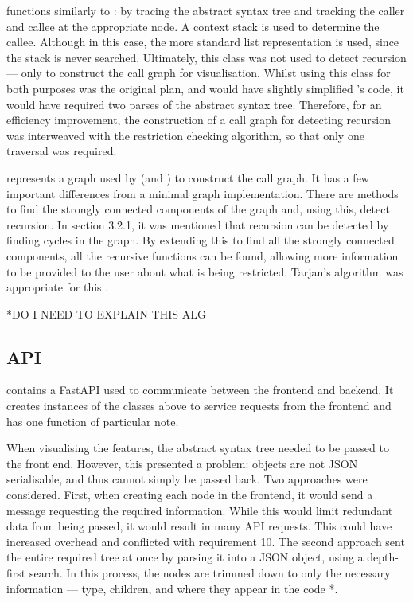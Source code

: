  functions similarly to : by tracing the abstract syntax tree and tracking the caller and callee at the appropriate node. A context stack is used to determine the callee. Although in this case, the more standard list representation is used, since the stack is never searched.
Ultimately, this class was not used to detect recursion --- only to construct the call graph for visualisation. Whilst using this class for both purposes was the original plan, and would have slightly simplified 's code, it would have required two parses of the abstract syntax tree. Therefore, for an efficiency improvement, the construction of a call graph for detecting recursion was interweaved with the restriction checking algorithm, so that only one traversal was required.

 represents a graph used by  (and ) to construct the call graph. It has a few important differences from a minimal graph implementation. There are methods to find the strongly connected components of the graph and, using this, detect recursion. In section 3.2.1, it was mentioned that recursion can be detected by finding cycles in the graph. By extending this to find all the strongly connected components, all the recursive functions can be found, allowing more information to be provided to the user about what is being restricted. Tarjan's algorithm was appropriate for this \cite{tarjan_depth-first_1972}. 

*DO I NEED TO EXPLAIN THIS ALG

\subsection{API}

 contains a FastAPI used to communicate between the frontend and backend. It creates instances of the classes above to service requests from the frontend and has one function of particular note.

When visualising the features, the abstract syntax tree needed to be passed to the front end. However, this presented a problem:  objects are not JSON serialisable, and thus cannot simply be passed back. Two approaches were considered. First, when creating each node in the frontend, it would send a message requesting the required information. While this would limit redundant data from being passed, it would result in many API requests. This could have increased overhead and conflicted with requirement 10. The second approach sent the entire required tree at once by parsing it into a JSON object, using a depth-first search. In this process, the nodes are trimmed down to only the necessary information --- type, children, and where they appear in the code *.

